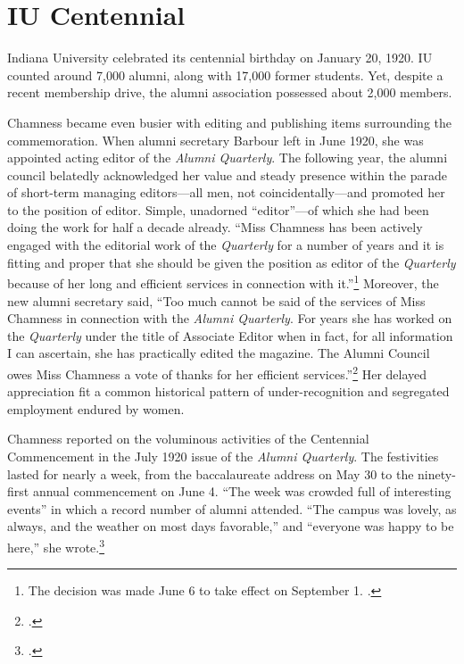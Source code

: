 \documentclass[
  american,
  letterpaper,
]{scrreprt}
\begin{document}
\section{IU Centennial}\label{iu-centennial}

Indiana University celebrated its centennial birthday on January 20,
1920. IU counted around 7,000 alumni, along with 17,000 former students.
Yet, despite a recent membership drive, the alumni association possessed
about 2,000 members.

Chamness became even busier with editing and publishing items
surrounding the commemoration. When alumni secretary Barbour left in
June 1920, she was appointed acting editor of the \emph{Alumni
Quarterly}. The following year, the alumni council belatedly
acknowledged her value and steady presence within the parade of
short-term managing editors---all men, not coincidentally---and promoted
her to the position of editor. Simple, unadorned ``editor''---of which
she had been doing the work for half a decade already. ``Miss Chamness
has been actively engaged with the editorial work of the
\emph{Quarterly} for a number of years and it is fitting and proper that
she should be given the position as editor of the \emph{Quarterly}
because of her long and efficient services in connection with
it.''\footnote{The decision was made June 6 to take effect on September
  1. .}
Moreover, the new alumni secretary said, ``Too much cannot be said of
the services of Miss Chamness in connection with the \emph{Alumni
Quarterly}. For years she has worked on the \emph{Quarterly} under the
title of Associate Editor when in fact, for all information I can
ascertain, she has practically edited the magazine. The Alumni Council
owes Miss Chamness a vote of thanks for her efficient
services.''\footnote{.} Her delayed appreciation fit a common historical
pattern of under-recognition and segregated employment endured by women.

Chamness reported on the voluminous activities of the Centennial
Commencement in the July 1920 issue of the \emph{Alumni Quarterly}. The
festivities lasted for nearly a week, from the baccalaureate address on
May 30 to the ninety-first annual commencement on June 4. ``The week was
crowded full of interesting events'' in which a record number of alumni
attended. ``The campus was lovely, as always, and the weather on most
days favorable,'' and ``everyone was happy to be here,'' she
wrote.\footnote{.}
\end{document}
